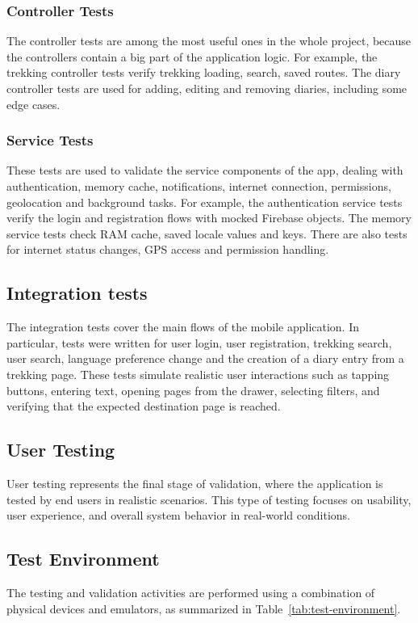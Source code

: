 \subsubsection{Controller Tests}
The controller tests are among the most useful ones in the whole project, because the controllers contain a big part of the application logic.
For example, the trekking controller tests verify trekking loading, search, saved routes. The diary controller tests are used for adding, editing and removing diaries, including some edge cases.




\subsubsection{Service Tests}
These tests are used to validate the service components of the app, dealing with authentication, memory cache, notifications, internet connection, permissions, geolocation and background tasks.
For example, the authentication service tests verify the login and registration flows with mocked Firebase objects. The memory service tests check RAM cache, saved locale values and keys. There are also tests for internet status changes, GPS access and permission handling.
\subsection{Integration tests}
The integration tests cover the main flows of the mobile application. In particular, tests were written for user login, user registration, trekking search, user search, language preference change and the creation of a diary entry from a trekking page. These tests simulate realistic user interactions such as tapping buttons, entering text, opening pages from the drawer, selecting filters, and verifying that the expected destination page is reached.
\subsection{User Testing}
User testing represents the final stage of validation, where the application is tested by end users in realistic scenarios. This type of testing focuses on usability, user experience, and overall system behavior in real-world conditions.
\subsection{Test Environment}

The testing and validation activities are performed using a combination of physical devices and emulators, as summarized in Table~\ref{tab:test-environment}.

